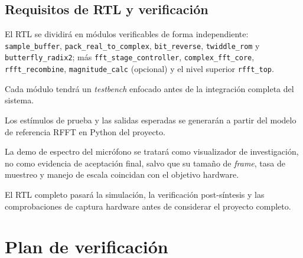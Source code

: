 \documentclass[11pt,a4paper]{article}
\begin{document}
\subsection{Requisitos de RTL y verificación}
\begin{description}[leftmargin=4.2em,style=nextline]
  \item[RTL-1:] El RTL se dividirá en módulos verificables de forma independiente:
    \texttt{sample\_buffer}, \texttt{pack\_real\_to\_complex},
    \texttt{bit\_reverse}, \texttt{twiddle\_rom} y \texttt{butterfly\_radix2};
    más \texttt{fft\_stage\_controller}, \texttt{complex\_fft\_core},
    \texttt{rfft\_recombine}, \texttt{magnitude\_calc} (opcional) y el
    nivel superior \texttt{rfft\_top}.
  \item[RTL-2:] Cada módulo tendrá un \emph{testbench} enfocado antes de la
    integración completa del sistema.
  \item[RTL-3:] Los estímulos de prueba y las salidas esperadas se generarán a
    partir del modelo de referencia RFFT en Python del proyecto.
  \item[RTL-4:] La demo de espectro del micrófono se tratará como visualizador de
    investigación, no como evidencia de aceptación final, salvo que su tamaño de
    \emph{frame}, tasa de muestreo y manejo de escala coincidan con el objetivo
    hardware.
  \item[RTL-5:] El RTL completo pasará la simulación, la verificación
    post-síntesis y las comprobaciones de captura hardware antes de considerar el
    proyecto completo.
\end{description}

\section{Plan de verificación}
\end{document}
